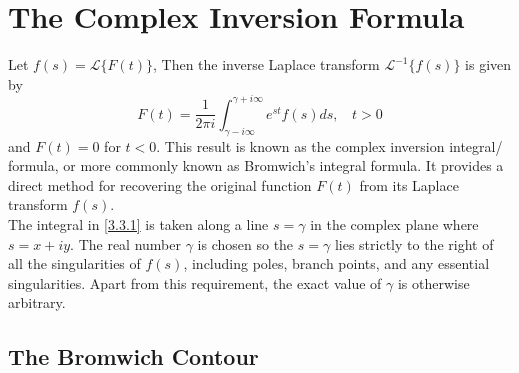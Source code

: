 \newpage
\section{The Complex Inversion Formula}\label{Sec3.3}

Let $f(s)=\mathcal{L}\{F(t)\}$, Then the inverse Laplace transform $\mathcal{L}^{-1}\{f(s)\}$ is given by 
\begin{equation}\label{3.3.1}
    F(t)=\frac{1}{2\pi i}\int^{\gamma+i\infty}_{\gamma-i\infty}e^{st}f(s)ds, \ \ \ \ t>0
\end{equation}
and $F(t)=0$ for $t<0$. This result is known as the complex inversion integral/ formula, or more commonly known as Bromwich's integral formula. It provides a direct method for recovering the original function $F(t)$ from its Laplace transform $f(s)$.
\\
The integral in \ref{3.3.1} is taken along a line $s=\gamma$ in the complex plane where $s=x+iy$. The real number $\gamma$ is chosen so the $s=\gamma$ lies strictly to the right of all the singularities of $f(s)$, including poles, branch points, and any essential singularities. Apart from this requirement, the exact value of $\gamma$ is otherwise arbitrary. \cite{TransformsTheory,RedBook,YellowBook,doetsch1974}

\subsection{The Bromwich Contour}\label{4.1.1}

